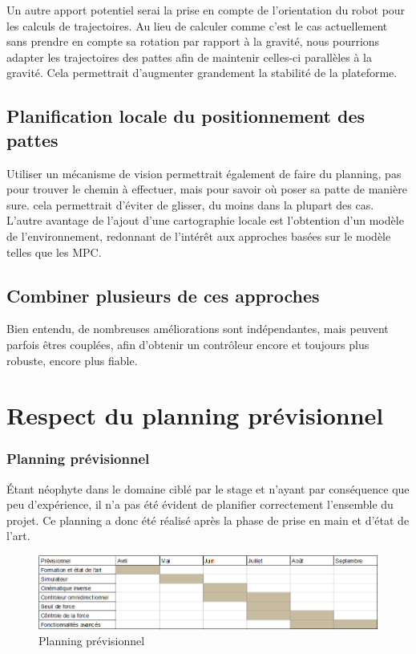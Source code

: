 \documentclass{tnreport}
\begin{document}
Un autre apport potentiel serai la prise en compte de l'orientation du robot pour les calculs de trajectoires. Au lieu de calculer comme c'est le cas actuellement sans prendre en compte sa rotation par rapport à la gravité, nous pourrions adapter les trajectoires des pattes afin de maintenir celles-ci parallèles à la gravité. Cela permettrait d'augmenter grandement la stabilité de la plateforme. 

\subsection{Planification locale du positionnement des pattes}
Utiliser un mécanisme de vision permettrait également de faire du planning, pas pour trouver le chemin à effectuer, mais pour savoir où poser sa patte de manière sure. cela permettrait d'éviter de glisser, du moins dans la plupart des cas. L'autre avantage de l'ajout d'une cartographie locale est l'obtention d'un modèle de l'environnement, redonnant de l'intérêt aux approches basées sur le modèle telles que les \gls{MPC}. 

\subsection{Combiner plusieurs de ces approches}
Bien entendu, de nombreuses améliorations sont indépendantes, mais peuvent parfois êtres couplées, afin d'obtenir un contrôleur encore et toujours plus robuste, encore plus fiable. 

\section{Respect du planning prévisionnel}
\subsubsection{Planning prévisionnel}
Étant néophyte dans le domaine ciblé par le stage et n'ayant par conséquence que peu d'expérience, il n'a pas été évident de planifier correctement l'ensemble du projet. Ce planning a donc été réalisé après la phase de prise en main et d'état de l'art. 
\begin{figure}[h]
    \centering
    \includegraphics[width=\textwidth]{figures/prev}
    \caption{Planning prévisionnel }
    \label{fig:prev}
\end{figure}
\end{document}
